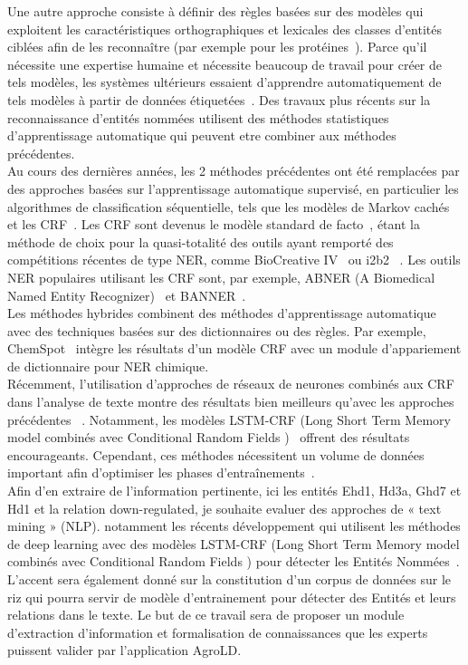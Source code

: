 Une autre approche consiste à définir des règles basées sur des modèles qui exploitent les caractéristiques orthographiques et lexicales des classes d'entités ciblées afin de les reconnaître (par exemple pour les protéines~\cite{Franzen2002}). Parce qu'il nécessite une expertise humaine et nécessite beaucoup de travail pour créer de tels modèles, les systèmes ultérieurs essaient d'apprendre automatiquement de tels modèles à partir de données étiquetées~\cite{Califf1999,Ciravegna1999}. Des travaux plus récents sur la reconnaissance d'entités nommées utilisent des méthodes statistiques d'apprentissage automatique qui peuvent etre combiner aux méthodes précédentes. \\

Au cours des dernières années, les 2 méthodes précédentes ont été remplacées par des approches basées sur l'apprentissage automatique supervisé, en particulier les algorithmes de classification séquentielle, tels que les modèles de Markov cachés~\cite{Rabiner1989} et les CRF~\cite{Lafferty2001}. Les CRF sont devenus le modèle standard de facto~\cite{Settles2004}, étant la méthode de choix pour la quasi-totalité des outils ayant remporté des compétitions récentes de type NER, comme BioCreative IV~\cite{Krallinger2013} ou i2b2~\cite{Uzuner2011} . Les outils NER populaires utilisant les CRF sont, par exemple, ABNER (A Biomedical Named Entity Recognizer)~\cite{Settles2005} et BANNER~\cite{LEAMAN2007}.\\
Les méthodes hybrides combinent des méthodes d'apprentissage automatique avec des techniques basées sur des dictionnaires ou des règles. Par exemple, ChemSpot~\cite{Rocktaschel2012} intègre les résultats d'un modèle CRF avec un module d'appariement de dictionnaire pour NER chimique.\\

Récemment, l'utilisation d'approches de réseaux de neurones combinés aux CRF dans l'analyse de texte montre des résultats bien meilleurs qu'avec les approches précédentes ~\cite{Segura-Bedmar2015}. Notamment, les modèles LSTM-CRF (Long Short Term Memory model combinés avec Conditional Random Fields )~\cite{Lample2016} offrent des résultats encourageants. Cependant, ces méthodes nécessitent un volume de données important afin d'optimiser les phases d'entraînements~\cite{Habibi2017a}. \\


Afin d’en extraire de l’information pertinente, ici les entités Ehd1, Hd3a, Ghd7 et Hd1 et la relation down-regulated, je souhaite evaluer des approches de « text mining » (NLP). notamment les récents développement qui utilisent les méthodes de deep learning avec des modèles LSTM-CRF (Long Short Term Memory model combinés avec Conditional Random Fields ) pour détecter les Entités Nommées~\cite{Habibi2017a,Basaldella2017}. L’accent sera également donné sur la constitution d’un corpus de données sur le riz qui pourra servir de modèle d’entrainement pour détecter des Entités et leurs relations dans le texte. Le but de ce travail sera de proposer un module d'extraction d’information et formalisation de connaissances que les experts puissent valider par l’application AgroLD. 



